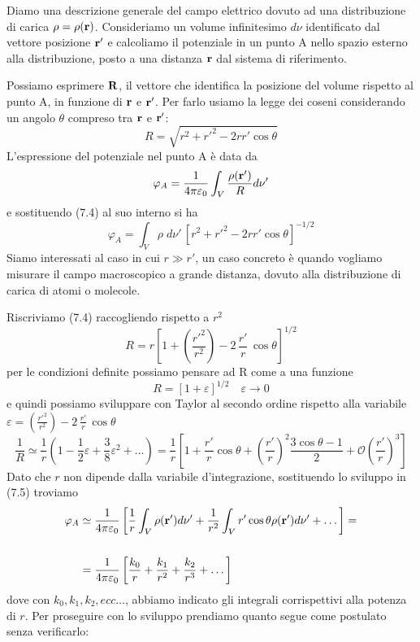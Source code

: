 Diamo una descrizione generale del campo elettrico dovuto ad una distribuzione di carica $\rho = \rho(\bold{r})$. Consideriamo un volume infinitesimo $d \nu$ identificato dal vettore posizione $\bold{r}'$ e calcoliamo il potenziale in un punto A nello spazio esterno alla distribuzione, posto a una distanza $\bold{r}$ dal sistema di riferimento.

Possiamo esprimere $\bold{R}$, il vettore che identifica la posizione del volume rispetto al punto A, in funzione di $\bold{r}$ e $\bold{r'}$. Per farlo usiamo la legge dei coseni considerando un angolo $\theta$ compreso tra $\bold{r}$ e $\bold{r'}$:
\begin{equation}
	R = \sqrt{r^2 + r'^2 - 2rr'\cos\theta}
\end{equation} 
L'espressione del potenziale nel punto A \`e data da 
\begin{equation*}
	\varphi_A = \frac{1}{4 \pi \varepsilon_0} \int_{V} \frac{\rho (\bold{r}')}{R}d\nu'
\end{equation*}
e sostituendo (7.4) al suo interno si ha 
\begin{equation}
	\varphi_A = \int_{V} \rho \;d \nu' \,[r^2 + r'^2 - 2rr'\cos\theta]^{-1/2}
\end{equation}
Siamo interessati al caso in cui $r \gg r'$, un caso concreto \`e quando vogliamo misurare il campo macroscopico a grande distanza, dovuto alla distribuzione di carica di atomi o molecole.

Riscriviamo (7.4) raccogliendo rispetto a $r^2$
\begin{equation*}
	R = r\left[1 + \left( \frac{r'^2}{r^2}\right) -2\,\frac{r'}{r}\,\cos\theta\right]^{1/2}
\end{equation*}
per le condizioni definite possiamo pensare ad R come a una funzione 
\begin{equation*}
	R = [1 + \varepsilon]^{1/2} \quad \varepsilon \to 0
\end{equation*}
e quindi possiamo sviluppare con Taylor al secondo ordine rispetto alla variabile $\varepsilon = \left( \frac{r'^2}{r^2}\right) -2\,\frac{r'}{r}\,\cos\theta$
\begin{equation*}
	\frac{1}{R} \simeq \frac{1}{r} \left(1 - \frac{1}{2} \varepsilon + \frac{3}{8}\varepsilon^2 + \dots\right) = \frac{1}{r} \left[ 1 + \frac{r'}{r}\cos \theta + \left(\frac{r'}{r}\right)^2  \frac{3 \cos\theta -1}{2} + \mathcal{O}\left(\frac{r'}{r}\right)^3\right]
\end{equation*}
Dato che $r$ non dipende dalla variabile d'integrazione, sostituendo lo sviluppo in (7.5) troviamo 
\begin{align}
	 \varphi_A & \simeq \frac{1}{4 \pi \varepsilon_0} \left[ \frac{1}{r} \int_{V} \rho(\bold{r}')d\nu' + \frac{1}{r^2} \int_{V} r' \cos\theta \rho(\bold{r}')d \nu' + \dots \right] = \notag \\ \rule{0pt}{30pt} 
	 & =  \frac{1}{4 \pi \varepsilon_0} \left[ \frac{k_0}{r} + \frac{k_1}{r^2} + \frac{k_2}{r^3}+ \dots \right] 
\end{align}
dove con $k_0,k_1,k_2, ecc \dots$, abbiamo indicato gli integrali corrispettivi alla potenza di $r$. Per proseguire con lo sviluppo prendiamo quanto segue come postulato senza verificarlo:

